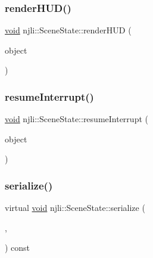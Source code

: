 \mbox{\label{classnjli_1_1_scene_state_a36c01e4a68cfcdf6b61ee8a52c878456}} 
\subsubsection{\texorpdfstring{render\+H\+U\+D()}{renderHUD()}}
{\footnotesize\ttfamily \mbox{\hyperlink{_thread_8h_af1e856da2e658414cb2456cb6f7ebc66}{void}} njli\+::\+Scene\+State\+::render\+H\+UD (\begin{DoxyParamCaption}\item[{\mbox{\hyperlink{classnjli_1_1_scene}{Scene}} $\ast$}]{object }\end{DoxyParamCaption})}

\mbox{\label{classnjli_1_1_scene_state_a075ad8f0e66c93ef018ba79fdc5b31be}} 
\subsubsection{\texorpdfstring{resume\+Interrupt()}{resumeInterrupt()}}
{\footnotesize\ttfamily \mbox{\hyperlink{_thread_8h_af1e856da2e658414cb2456cb6f7ebc66}{void}} njli\+::\+Scene\+State\+::resume\+Interrupt (\begin{DoxyParamCaption}\item[{\mbox{\hyperlink{classnjli_1_1_scene}{Scene}} $\ast$}]{object }\end{DoxyParamCaption})}

\mbox{\label{classnjli_1_1_scene_state_a15557415360834103de80e85e235cb78}} 
\subsubsection{\texorpdfstring{serialize()}{serialize()}}
{\footnotesize\ttfamily virtual \mbox{\hyperlink{_thread_8h_af1e856da2e658414cb2456cb6f7ebc66}{void}} njli\+::\+Scene\+State\+::serialize (\begin{DoxyParamCaption}\item[{\mbox{\hyperlink{_thread_8h_af1e856da2e658414cb2456cb6f7ebc66}{void}} $\ast$}]{,  }\item[{bt\+Serializer $\ast$}]{ }\end{DoxyParamCaption}) const\hspace{0.3cm}{\ttfamily [virtual]}}

